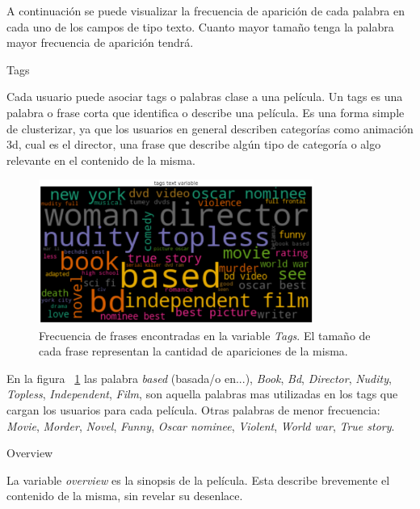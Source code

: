 \documentclass[11pt,a4paper,twoside]{thesis}
\begin{document}
A continuación se puede visualizar la frecuencia de aparición de cada palabra en cada uno de los campos de tipo texto. Cuanto mayor tamaño tenga la palabra mayor frecuencia de aparición tendrá.

\begin{description}
	\item[Tags]
\end{description}

Cada usuario puede asociar tags o palabras clase a una película. Un tags es una palabra o frase corta que identifica o describe una película. Es una forma simple de clusterizar, ya que los usuarios en general describen categorías como animación 3d, cual es el director, una frase que describe algún tipo de categoría o algo relevante en el contenido de la misma. 

\begin{figure}[h!]
	\centering
	\includegraphics[width=9cm]{./images/Cloud-tags.png}
	\caption{Frecuencia de frases encontradas en la variable \textit{Tags}. El tamaño de cada frase representan la cantidad de apariciones de la misma.}
	\label{fig:tagsCloud}
\end{figure}	


En la figura ~\ref{fig:tagsCloud} las palabra \textit{based} (basada/o en...), \textit{Book}, \textit{Bd}, \textit{Director}, \textit{Nudity}, \textit{Topless}, \textit{Independent}, \textit{Film}, son aquella palabras mas utilizadas en los tags que cargan los usuarios para cada película. Otras palabras de menor frecuencia: \textit{Movie}, \textit{Morder}, \textit{Novel}, \textit{Funny}, \textit{Oscar nominee}, \textit{Violent}, \textit{World war}, \textit{True story}.


\clearpage

\begin{description}
	\item[Overview]
\end{description}

La variable \textit{overview} es la sinopsis de la película. Esta describe brevemente el contenido de la misma, sin revelar su desenlace.
\end{document}
